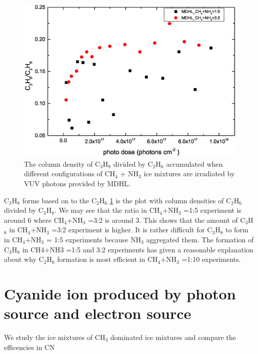 \begin{figure}
\centering
\includegraphics[width=\textwidth]{figures/chapter3/Lab_C3H8_C2H6.eps}
\caption{The column density of C$_3$H$_8$ divided by C$_2$H$_6$ accumulated when different configurations of CH$_4$ + NH$_3$ ice mixtures are irradiated by VUV photons provided by MDHL.}
\label{fig:C2H6_C3H8}
\end{figure}

C$_3$H$_8$ forms based on to the C$_2$H$_6$ \ref{fig:C2H6_C3H8} is the plot with column densities of C$_2$H$_6$ divided by C$_3$H$_8$. We may see that the ratio in CH$_4$+NH$_3$ =1:5 experiment is around 6 where CH$_4$+NH$_3$ =3:2 is around 3. This shows that the amount of C$_3$H$_8$ in CH$_4$+NH$_3$ =3:2 experiment is higher. It is rather difficult for C$_3$H$_8$ to form in CH$_4$+NH$_3$ = 1:5 experiments because NH$_3$ aggregated them. The formation of C$_3$H$_8$ in CH4+NH3 =1:5 and 3:2 experiments has given a reasonable explanation about why C$_2$H$_6$ formation is most efficient in CH$_4$+NH$_3$ =1:10 experiments.

\section{Cyanide ion produced by photon source and electron source}

We study the ice mixtures of CH$_3$ dominated ice mixtures and compare the efficencies in CN%

